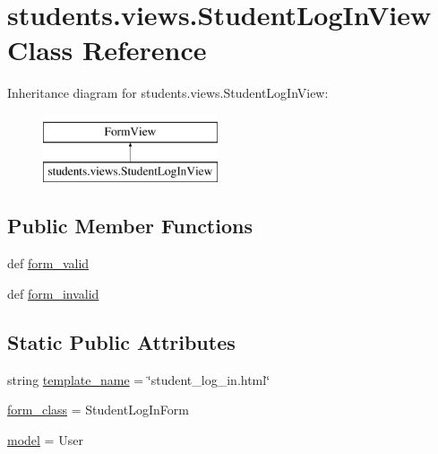 \hypertarget{classstudents_1_1views_1_1_student_log_in_view}{\section{students.\-views.\-Student\-Log\-In\-View Class Reference}
\label{classstudents_1_1views_1_1_student_log_in_view}
}
Inheritance diagram for students.\-views.\-Student\-Log\-In\-View\-:\begin{figure}[H]
\begin{center}
\leavevmode
\includegraphics[height=2.000000cm]{classstudents_1_1views_1_1_student_log_in_view}
\end{center}
\end{figure}
\subsection*{Public Member Functions}
\begin{DoxyCompactItemize}
\item 
def \hyperlink{classstudents_1_1views_1_1_student_log_in_view_a090cfaafcae5b8aae1a89fbbd2325b63}{form\-\_\-valid}
\item 
def \hyperlink{classstudents_1_1views_1_1_student_log_in_view_a366b874458816a4940268304c2096fca}{form\-\_\-invalid}
\end{DoxyCompactItemize}
\subsection*{Static Public Attributes}
\begin{DoxyCompactItemize}
\item 
string \hyperlink{classstudents_1_1views_1_1_student_log_in_view_a6c533a74b8b7c2eab25e8e357aed18be}{template\-\_\-name} = \char`\"{}student\-\_\-log\-\_\-in.\-html\char`\"{}
\item 
\hyperlink{classstudents_1_1views_1_1_student_log_in_view_a3e3e16f553aee428f087b669da95ada0}{form\-\_\-class} = Student\-Log\-In\-Form
\item 
\hyperlink{classstudents_1_1views_1_1_student_log_in_view_a5acd7d5724d7a6cbc0963424420c4f5e}{model} = User
\end{DoxyCompactItemize}


